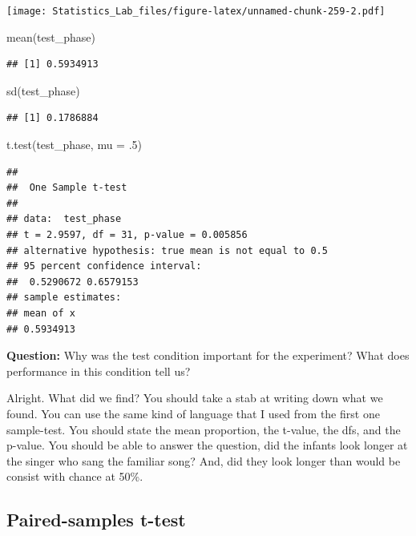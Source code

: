 \documentclass[
]{book}
\newenvironment{Shaded}{\begin{snugshade}}{\end{snugshade}}
\newcommand{\AttributeTok}[1]{\textcolor[rgb]{0.77,0.63,0.00}{#1}}
\newcommand{\DecValTok}[1]{\textcolor[rgb]{0.00,0.00,0.81}{#1}}
\newcommand{\FunctionTok}[1]{\textcolor[rgb]{0.00,0.00,0.00}{#1}}
\newcommand{\NormalTok}[1]{#1}
\begin{document}
\texttt{[image: Statistics\_Lab\_files/figure-latex/unnamed-chunk-259-2.pdf]}

\begin{Shaded}
\begin{Highlighting}[]
\FunctionTok{mean}\NormalTok{(test\_phase)}
\end{Highlighting}
\end{Shaded}

\begin{verbatim}
## [1] 0.5934913
\end{verbatim}

\begin{Shaded}
\begin{Highlighting}[]
\FunctionTok{sd}\NormalTok{(test\_phase)}
\end{Highlighting}
\end{Shaded}

\begin{verbatim}
## [1] 0.1786884
\end{verbatim}

\begin{Shaded}
\begin{Highlighting}[]
\FunctionTok{t.test}\NormalTok{(test\_phase, }\AttributeTok{mu =}\NormalTok{ .}\DecValTok{5}\NormalTok{)}
\end{Highlighting}
\end{Shaded}

\begin{verbatim}
## 
##  One Sample t-test
## 
## data:  test_phase
## t = 2.9597, df = 31, p-value = 0.005856
## alternative hypothesis: true mean is not equal to 0.5
## 95 percent confidence interval:
##  0.5290672 0.6579153
## sample estimates:
## mean of x 
## 0.5934913
\end{verbatim}

\textbf{Question:} Why was the test condition important for the experiment? What does performance in this condition tell us?

Alright. What did we find? You should take a stab at writing down what we found. You can use the same kind of language that I used from the first one sample-test. You should state the mean proportion, the t-value, the dfs, and the p-value. You should be able to answer the question, did the infants look longer at the singer who sang the familiar song? And, did they look longer than would be consist with chance at 50\%.

\hypertarget{paired-samples-t-test}{%
\subsection{Paired-samples t-test}\label{paired-samples-t-test}}
\end{document}
